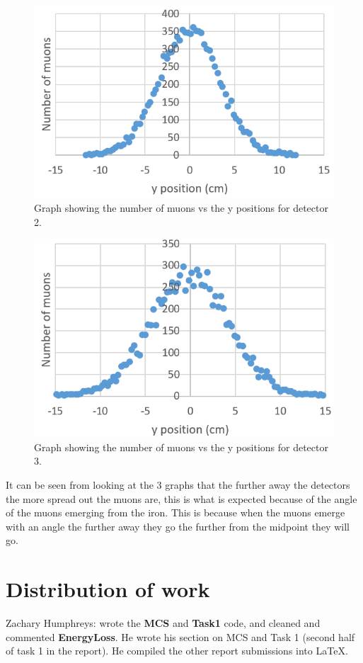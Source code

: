\documentclass[twocolumn]{article}
\begin{document}
\begin{figure}
	\includegraphics[scale=0.3]{Images/Graph6.png}
	\caption{\label{graph6}Graph showing the number of muons vs the y positions for detector 2.}
\end{figure}
\begin{figure}
	\includegraphics[scale=0.3]{Images/Graph7.png}
	\caption{\label{graph7}Graph showing the number of muons vs the y positions for detector 3.}
\end{figure}
\indent It can be seen from looking at the 3 graphs that the further away the detectors the more spread out the muons are, this is what is expected because of the angle of the muons emerging from the iron. This is because when the muons emerge with an angle the further away they go the further from the midpoint they will go. 

\section{Distribution of work}
Zachary Humphreys: wrote the \textbf{MCS} and \textbf{Task1} code, and cleaned and commented \textbf{EnergyLoss}. He wrote his section on MCS and Task 1 (second half of task 1 in the report). He compiled the other report submissions into \LaTeX.
\end{document}
